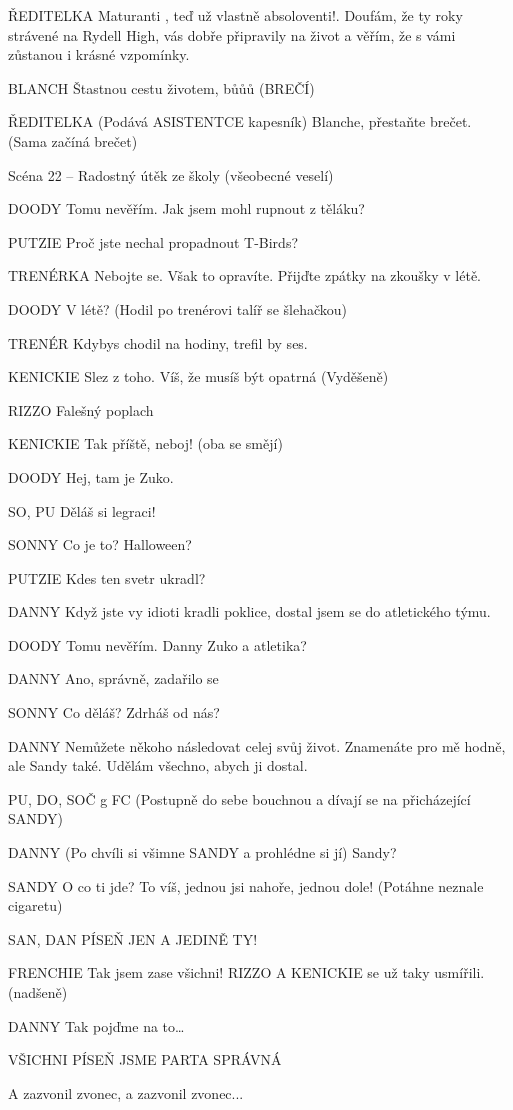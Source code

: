 ŘEDITELKA        Maturanti , teď už vlastně absoloventi!.  Doufám, že ty roky strávené na         Rydell High, vás dobře připravily na život a věřím, že s vámi zůstanou i         krásné vzpomínky. 

BLANCH        Štastnou cestu životem, bůůů (BREČÍ)

ŘEDITELKA        (Podává ASISTENTCE kapesník) Blanche, přestaňte brečet. (Sama                 začíná brečet)





Scéna 22  – Radostný útěk ze školy (všeobecné veselí)

DOODY        Tomu nevěřím. Jak jsem mohl rupnout z těláku?

PUTZIE        Proč jste nechal propadnout T-Birds?

TRENÉRKA        Nebojte se. Však to opravíte. Přijďte zpátky na zkoušky v létě.

DOODY        V létě? (Hodil po trenérovi talíř se šlehačkou)

TRENÉR        Kdybys chodil na hodiny, trefil by ses.

KENICKIE        Slez z toho. Víš, že musíš být opatrná (Vyděšeně)

RIZZO        Falešný poplach

KENICKIE        Tak příště, neboj! (oba se smějí)

DOODY        Hej, tam je Zuko. 

SO, PU        Děláš si legraci!

SONNY        Co je to? Halloween?

PUTZIE        Kdes ten svetr ukradl?

DANNY        Když jste vy idioti kradli poklice, dostal jsem se do atletického týmu. 

DOODY        Tomu nevěřím. Danny Zuko a atletika?

DANNY        Ano, správně, zadařilo se

SONNY        Co děláš? Zdrháš od nás?

DANNY        Nemůžete někoho následovat celej svůj život. Znamenáte pro mě hodně, ale         Sandy také. Udělám všechno, abych ji dostal. 

PU, DO, SOČ g FC        (Postupně do sebe bouchnou a dívají se na přicházející SANDY) 

DANNY        (Po chvíli si všimne SANDY a prohlédne si jí) Sandy?

SANDY        O co ti jde?  To víš, jednou jsi nahoře, jednou dole! (Potáhne neznale         cigaretu)

SAN, DAN        PÍSEŇ JEN A JEDINĚ TY! 





FRENCHIE        Tak jsem zase všichni! RIZZO A KENICKIE se už taky usmířili. (nadšeně) 

DANNY        Tak pojďme na to…

VŠICHNI        PÍSEŇ JSME PARTA SPRÁVNÁ 

A zazvonil zvonec, a zazvonil zvonec...



\bye

